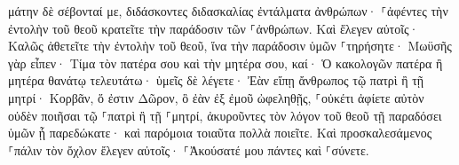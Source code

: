 \documentclass{openreader}
\begin{document}
μάτην δὲ σέβονταί με, διδάσκοντες διδασκαλίας ἐντάλματα ἀνθρώπων· 
⸀ἀφέντες τὴν ἐντολὴν τοῦ θεοῦ κρατεῖτε τὴν παράδοσιν τῶν ⸀ἀνθρώπων. 
Καὶ ἔλεγεν αὐτοῖς· Καλῶς ἀθετεῖτε τὴν ἐντολὴν τοῦ θεοῦ, ἵνα τὴν παράδοσιν ὑμῶν ⸀τηρήσητε· 
Μωϋσῆς γὰρ εἶπεν· Τίμα τὸν πατέρα σου καὶ τὴν μητέρα σου, καί· Ὁ κακολογῶν πατέρα ἢ μητέρα θανάτῳ τελευτάτω· 
ὑμεῖς δὲ λέγετε· Ἐὰν εἴπῃ ἄνθρωπος τῷ πατρὶ ἢ τῇ μητρί· Κορβᾶν, ὅ ἐστιν Δῶρον, ὃ ἐὰν ἐξ ἐμοῦ ὠφεληθῇς, 
⸀οὐκέτι ἀφίετε αὐτὸν οὐδὲν ποιῆσαι τῷ ⸀πατρὶ ἢ τῇ ⸀μητρί, 
ἀκυροῦντες τὸν λόγον τοῦ θεοῦ τῇ παραδόσει ὑμῶν ᾗ παρεδώκατε· καὶ παρόμοια τοιαῦτα πολλὰ ποιεῖτε. 
Καὶ προσκαλεσάμενος ⸀πάλιν τὸν ὄχλον ἔλεγεν αὐτοῖς· ⸀Ἀκούσατέ μου πάντες καὶ ⸀σύνετε. 
\end{document}
